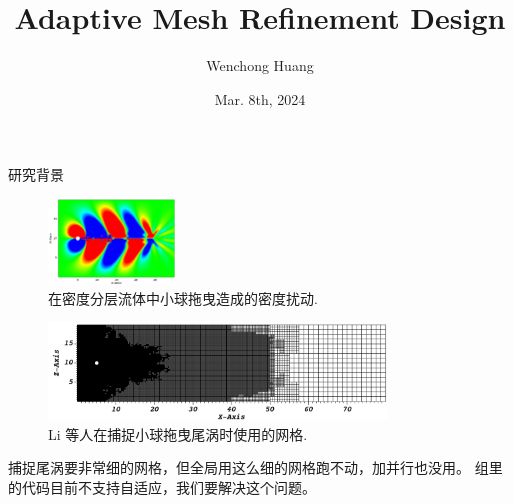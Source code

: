 \documentclass[10pt]{beamer}
\author{Wenchong Huang}
\title{Adaptive Mesh Refinement Design}
\institute{
    School of Mathematical Sciences, \\
    Zhejiang University.
}
\date{Mar. 8th, 2024}
\begin{document}
\begin{frame}
    \titlepage
\end{frame}

\begin{frame}[fragile]{研究背景}
    \footnotesize

    \begin{figure}[H]
        \centering
        \includegraphics[width=0.3\textwidth]{png/densityPerturbation.png}
        \caption{\footnotesize 在密度分层流体中小球拖曳造成的密度扰动.}
    \end{figure}

    \vspace{-1em}

    \begin{figure}[H]
        \centering
        \includegraphics[width=0.8\textwidth]{png/amrdealii.png}
        \caption{\footnotesize Li 等人在捕捉小球拖曳尾涡时使用的网格.}
    \end{figure}

    \vspace{-1em}

    捕捉尾涡要非常细的网格，但全局用这么细的网格跑不动，加并行也没用。
    组里的代码目前不支持自适应，我们要解决这个问题。
\end{frame}
\end{document}
